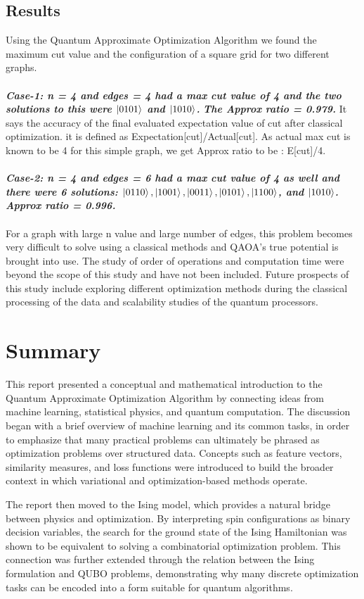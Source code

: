 \documentclass[english,12pt,a4paper]{report}
\begin{document}
	 \section{Results}
	 Using the Quantum Approximate Optimization Algorithm we found the maximum cut value and the configuration of a square grid for two different graphs.
	 \\\\
\emph{\textbf{	Case-1: n = 4 and edges = 4 had a max cut value of 4 and the two solutions to this were $\ket{0101}$ and $\ket{1010}$.}}
	\emph{\textbf{The Approx ratio = 0.979.}} It says the accuracy of the final evaluated expectation value of cut after classical optimization. it is defined as Expectation[cut]/Actual[cut]. As actual max cut is known to be 4 for this simple graph, we get Approx ratio to be : E[cut]/4.\\\\
\textbf{\emph{	Case-2: n = 4 and edges = 6 had a max cut value of 4 as well and there were 6 solutions: $\ket{0110},\ket{1001},\ket{0011},\ket{0101},\ket{1100}$, and $\ket{1010}$. Approx ratio = 0.996.}}
	\\\\For a graph with large n value and large number of edges, this problem becomes very difficult to solve using a classical methods and QAOA's true potential is brought into use. The study of order of operations and computation time were beyond the scope of this study and have not been included. Future prospects of this study include exploring different optimization methods during the classical processing of the data and scalability studies of the quantum processors. 
	\chapter*{Summary}
	This report presented a conceptual and mathematical introduction to the Quantum Approximate Optimization Algorithm by connecting ideas from machine learning, statistical physics, and quantum computation. The discussion began with a brief overview of machine learning and its common tasks, in order to emphasize that many practical problems can ultimately be phrased as optimization problems over structured data. Concepts such as feature vectors, similarity measures, and loss functions were introduced to build the broader context in which variational and optimization-based methods operate.
	
	The report then moved to the Ising model, which provides a natural bridge between physics and optimization. By interpreting spin configurations as binary decision variables, the search for the ground state of the Ising Hamiltonian was shown to be equivalent to solving a combinatorial optimization problem. This connection was further extended through the relation between the Ising formulation and QUBO problems, demonstrating why many discrete optimization tasks can be encoded into a form suitable for quantum algorithms.
	
\end{document}
